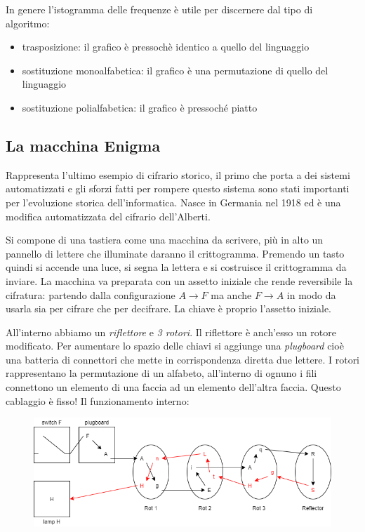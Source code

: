 In genere l'istogramma delle frequenze è utile per discernere dal tipo di algoritmo:
\begin{itemize}
    \item trasposizione: il grafico è pressochè identico a quello del linguaggio
    \item sostituzione monoalfabetica: il grafico è una permutazione di quello del linguaggio
    \item sostituzione polialfabetica: il grafico è pressoché piatto
\end{itemize}

\subsection{La macchina Enigma}
Rappresenta l'ultimo esempio di cifrario storico, il primo che porta a dei sistemi automatizzati e gli sforzi fatti per rompere questo sistema sono stati importanti per l'evoluzione storica dell'informatica. Nasce in Germania nel 1918 ed è una modifica automatizzata del cifrario dell'Alberti.

Si compone di una tastiera come una macchina da scrivere, più in alto un pannello di lettere che illuminate daranno il crittogramma. Premendo un tasto quindi si accende una luce, si segna la lettera e si costruisce il crittogramma da inviare. La macchina va preparata con un assetto iniziale che rende reversibile la cifratura: partendo dalla configurazione $A \xrightarrow{} F$ ma anche $F \xrightarrow{} A$ in modo da usarla sia per cifrare che per decifrare. La chiave è proprio l'assetto iniziale.

All'interno abbiamo un \emph{riflettore} e \emph{3 rotori}. Il riflettore è anch'esso un rotore modificato. Per aumentare lo spazio delle chiavi si aggiunge una \emph{plugboard} cioè una batteria di connettori che mette in corrispondenza diretta due lettere. I rotori rappresentano la permutazione di un alfabeto, all'interno di ognuno i fili connettono un elemento di una faccia ad un elemento dell'altra faccia. Questo cablaggio è fisso!
Il funzionamento interno:

\begin{figure}[H]
  \centering
  \includegraphics[width = 325pt]{Enigma.png}
\end{figure}

